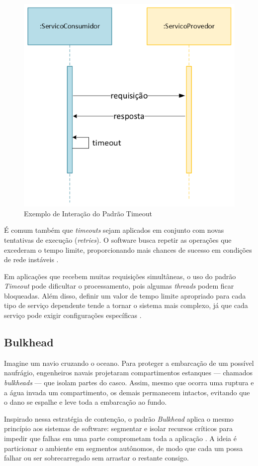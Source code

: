 \begin{figure}[H] \centering \includegraphics[width=0.5\linewidth]{imagens/interaction-timeout-pattern.png} \caption{Exemplo de Interação do Padrão Timeout \citep{troubitsyna2019}} \label{fig:interaction-timeout-pattern} \end{figure}

É comum também que \textit{timeouts} sejam aplicados em conjunto com novas tentativas de execução (\textit{retries}). O software busca repetir as operações que excederam o tempo limite, proporcionando mais chances de sucesso em condições de rede instáveis \citep{nygard2018release}.

Em aplicações que recebem muitas requisições simultâneas, o uso do padrão \textit{Timeout} pode dificultar o processamento, pois algumas \textit{threads} podem ficar bloqueadas. Além disso, definir um valor de tempo limite apropriado para cada tipo de serviço dependente tende a tornar o sistema mais complexo, já que cada serviço pode exigir configurações específicas \citep{kostenko2023antifragile}.

\subsection{Bulkhead}

Imagine um navio cruzando o oceano. Para proteger a embarcação de um possível naufrágio, engenheiros navais projetaram compartimentos estanques — chamados \textit{bulkheads} — que isolam partes do casco. Assim, mesmo que ocorra uma ruptura e a água invada um compartimento, os demais permanecem intactos, evitando que o dano se espalhe e leve toda a embarcação ao fundo.

Inspirado nessa estratégia de contenção, o padrão \textit{Bulkhead} aplica o mesmo princípio aos sistemas de software: segmentar e isolar recursos críticos para impedir que falhas em uma parte comprometam toda a aplicação \citep{nygard2018release}. A ideia é particionar o ambiente em segmentos autônomos, de modo que cada um possa falhar ou ser sobrecarregado sem arrastar o restante consigo.

